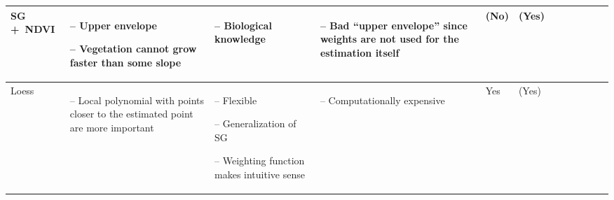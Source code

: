 \begin{table}[!ht]
\begin{tabular}{p{1.6cm}p{3.3cm}p{3.3cm}p{3.4cm}p{0.4cm}p{0.4cm}p{3cm}p{3cm}p{3cm}p{3cm}p{2.7cm}p{3cm}|}
		SG +~NDVI                                                                                                                                                    &
		\begin{cptitemize} \item[--]  Upper envelope \item[--]  Vegetation cannot grow faster than some slope                                \end{cptitemize}        &
		\begin{cptitemize} \item[--]  Biological knowledge                                                                            \end{cptitemize}               &
		\begin{cptitemize} \item[--]  Bad ``upper envelope'' since weights are not used for the estimation itself                    \end{cptitemize}               &
		(No)                                                                                                                                                         &
		(Yes)                                                                                                                                                         \\ \hline%

		Loess                                                                                                                                                        &
		\begin{cptitemize} \item[--]  Local  polynomial with points closer to the estimated point are more important                  \end{cptitemize}               &
		\begin{cptitemize} \item[--]  Flexible \item[--]  Generalization of SG \item[--]  Weighting function makes intuitive sense                  \end{cptitemize} &
		\begin{cptitemize} \item[--]  Computationally expensive                                                                       \end{cptitemize}               &
		Yes                                                                                                                                                          &
		(Yes)                                                                                                                                                         \\ \hline%


\end{tabular}
\end{table}
